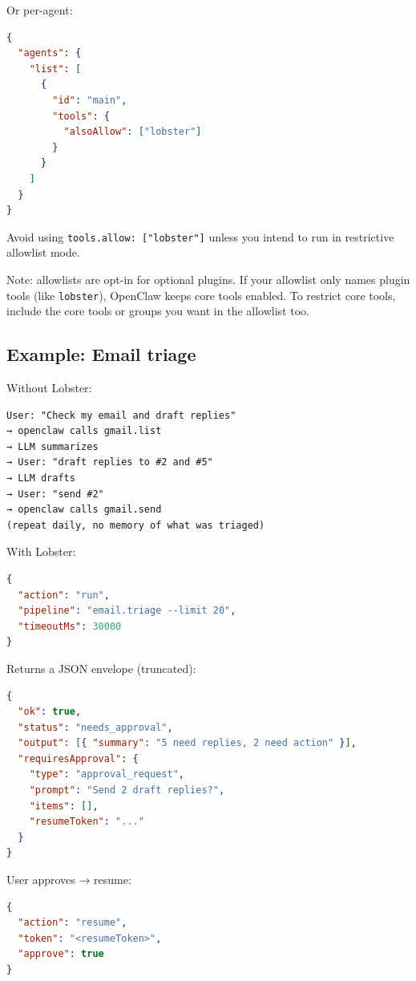 Or per-agent:

\begin{lstlisting}[language=json]
{
  "agents": {
    "list": [
      {
        "id": "main",
        "tools": {
          "alsoAllow": ["lobster"]
        }
      }
    ]
  }
}
\end{lstlisting}


Avoid using \texttt{tools.allow: ["lobster"]} unless you intend to run in restrictive allowlist mode.

Note: allowlists are opt-in for optional plugins. If your allowlist only names
plugin tools (like \texttt{lobster}), OpenClaw keeps core tools enabled. To restrict core
tools, include the core tools or groups you want in the allowlist too.

\subsection{Example: Email triage}


Without Lobster:

\begin{lstlisting}
User: "Check my email and draft replies"
→ openclaw calls gmail.list
→ LLM summarizes
→ User: "draft replies to #2 and #5"
→ LLM drafts
→ User: "send #2"
→ openclaw calls gmail.send
(repeat daily, no memory of what was triaged)
\end{lstlisting}


With Lobster:

\begin{lstlisting}[language=json]
{
  "action": "run",
  "pipeline": "email.triage --limit 20",
  "timeoutMs": 30000
}
\end{lstlisting}


Returns a JSON envelope (truncated):

\begin{lstlisting}[language=json]
{
  "ok": true,
  "status": "needs_approval",
  "output": [{ "summary": "5 need replies, 2 need action" }],
  "requiresApproval": {
    "type": "approval_request",
    "prompt": "Send 2 draft replies?",
    "items": [],
    "resumeToken": "..."
  }
}
\end{lstlisting}


User approves → resume:

\begin{lstlisting}[language=json]
{
  "action": "resume",
  "token": "<resumeToken>",
  "approve": true
}
\end{lstlisting}


